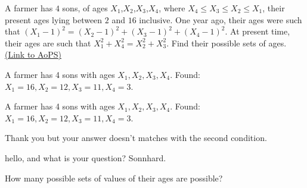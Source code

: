 \begin{problem}
	A farmer has $4$ sons, of ages $X_1$,$X_2$,$X_3$,$X_4$, where $X_4\le X_3\le X_2\le X_1$, their present ages lying between $2$ and $16$ inclusive. One year ago, their ages were such that $(X_1-1)^2 = (X_2-1)^2+(X_3-1)^2+(X_4-1)^2$. At present time, their ages are such that $X_1^2+X_4^2 = X_2^2+X_3^2$. Find their possible sets of ages.
	\flushright \href{https://artofproblemsolving.com/community/c6h535902}{(Link to AoPS)}
\end{problem}



\begin{solution}
	A farmer has 4 sons with ages $ X_1, X_2,X_3,X_4 $.
Found: $X_1=16, X_2=12,X_3=11,X_4=3 $.
\end{solution}



\begin{solution}
	\begin{tcolorbox}A farmer has 4 sons with ages $ X_1, X_2,X_3,X_4 $.
Found: $X_1=16, X_2=12,X_3=11,X_4=3 $.\end{tcolorbox}
Thank you but your answer doesn't matches with the second condition.
\end{solution}



\begin{solution}
	\begin{tcolorbox}hello, and what is your question?
Sonnhard.\end{tcolorbox}
How many possible sets of values of their ages are possible?
\end{solution}







